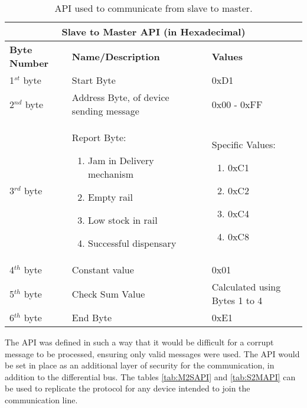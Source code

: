 \documentclass[a4paper,11pt]{article}
\numberwithin{figure}{section}
\numberwithin{table}{section}
\begin{document}
	\begin{center}
		\begin{table}[ht]
			\centering
			\begin{tabular}{| m{3cm} | m{5cm}| m{5cm} |}
			\hline
			\multicolumn{3}{|c|}{\bfseries Slave to Master API (in Hexadecimal)}\\
			\hline
			\bfseries{Byte Number}  & \bfseries{Name/Description} & \bfseries{Values} \\
			\hline
			1$^{st}$ byte & Start Byte & 0xD1\\
			\hline
			2$^{nd}$ byte & Address Byte, of device sending message & 0x00 - 0xFF\\
			\hline
			3$^{rd}$ byte & Report Byte:\begin{enumerate}
											\setlength{\itemsep}{0pt}
   											\setlength{\parskip}{0pt}
    										\setlength{\parsep}{0pt} 
											\item Jam in Delivery mechanism
											\item Empty rail
											\item Low stock in rail
											\item Successful dispensary
										\end{enumerate} & Specific Values: \begin{enumerate}[noitemsep,topsep=0pt]
																				\setlength{\itemsep}{0pt}
   																				\setlength{\parskip}{0pt}
    																			\setlength{\parsep}{0pt} 
																				\item 0xC1
																				\item 0xC2
																				\item 0xC4
																				\item 0xC8
																			\end{enumerate}\\
			\hline
			4$^{th}$ byte & Constant value & 0x01 \\
			\hline
			5$^{th}$ byte & Check Sum Value & Calculated using Bytes 1 to 4\\
			\hline
			6$^{th}$ byte & End Byte & 0xE1 \\
			\hline
			\end{tabular}
		\caption{API used to communicate from slave to master. \label{tab:S2MAPI}}
		\end{table}
	\end{center}

The API was defined in such a way that it would be difficult for a corrupt message to be processed, ensuring only valid messages were used. The API would be set in place as an additional layer of security for the communication, in addition to the differential bus. The tables \autoref{tab:M2SAPI} and \autoref{tab:S2MAPI} can be used to replicate the protocol for any device intended to join the communication line.
\end{document}
